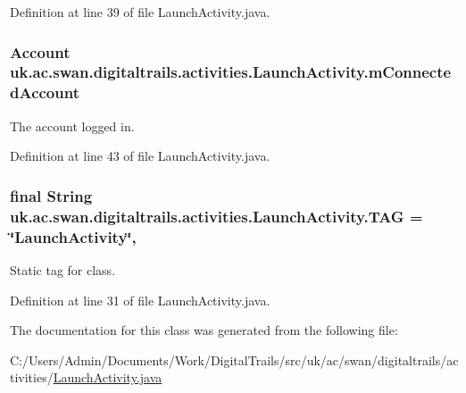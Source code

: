 Definition at line 39 of file Launch\+Activity.\+java.

\hypertarget{classuk_1_1ac_1_1swan_1_1digitaltrails_1_1activities_1_1_launch_activity_ac396014effc4cb4bd931b6d6a15a1a73}{
\subsubsection[{m\+Connected\+Account}]{\setlength{\rightskip}{0pt plus 5cm}Account uk.\+ac.\+swan.\+digitaltrails.\+activities.\+Launch\+Activity.\+m\+Connected\+Account\hspace{0.3cm}{\ttfamily [private]}}}\label{classuk_1_1ac_1_1swan_1_1digitaltrails_1_1activities_1_1_launch_activity_ac396014effc4cb4bd931b6d6a15a1a73}


The account logged in. 



Definition at line 43 of file Launch\+Activity.\+java.

\hypertarget{classuk_1_1ac_1_1swan_1_1digitaltrails_1_1activities_1_1_launch_activity_aa53153dcb7045420665e6499ba4a13a1}{
\subsubsection[{T\+A\+G}]{\setlength{\rightskip}{0pt plus 5cm}final String uk.\+ac.\+swan.\+digitaltrails.\+activities.\+Launch\+Activity.\+T\+A\+G = \char`\"{}Launch\+Activity\char`\"{}\hspace{0.3cm}{\ttfamily [static]}, {\ttfamily [private]}}}\label{classuk_1_1ac_1_1swan_1_1digitaltrails_1_1activities_1_1_launch_activity_aa53153dcb7045420665e6499ba4a13a1}


Static tag for class. 



Definition at line 31 of file Launch\+Activity.\+java.



The documentation for this class was generated from the following file\+:\begin{DoxyCompactItemize}
\item 
C\+:/\+Users/\+Admin/\+Documents/\+Work/\+Digital\+Trails/src/uk/ac/swan/digitaltrails/activities/\hyperlink{_launch_activity_8java}{Launch\+Activity.\+java}\end{DoxyCompactItemize}
